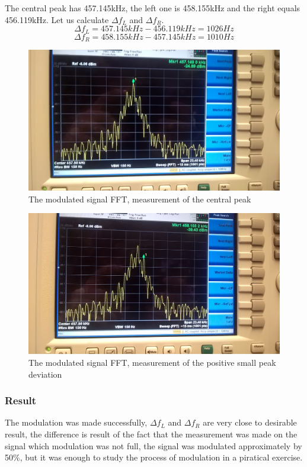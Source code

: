 \documentclass[english]{article}
\begin{document}
The central peak has 457.145kHz, the left one is 458.155kHz and the right equals 456.119kHz. Let us calculate $\Delta f_L$ and $\Delta f_R$.
$$
\Delta f_L=457.145kHz-456.119kHz=1026Hz
$$
$$
\Delta f_R=458.155kHz-457.145kHz=1010Hz
$$
\begin{figure}[H]
\centerline{\includegraphics[scale=0.09]{AM/WP_20140925_022}}
\caption{The modulated signal FFT, measurement of the central peak}
\end{figure}
\begin{figure}[H]
\centerline{\includegraphics[scale=0.09]{AM/WP_20140925_023}}
\caption{The modulated signal FFT, measurement of the positive small peak deviation}
\end{figure}
\subsubsection{Result}
The modulation was made successfully, $\Delta f_L$ and $\Delta f_R$ are very close to desirable result, the difference is result of the fact that the measurement was made on the signal which modulation was not full, the signal was modulated approximately by 50\%, but it was enough to study the process of modulation in a piratical exercise.
\end{document}
